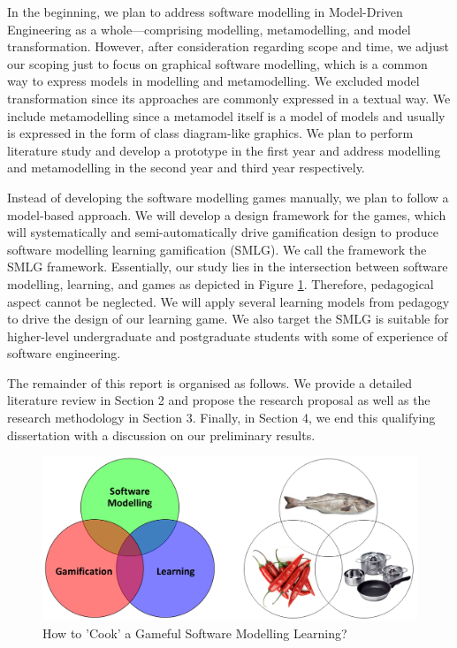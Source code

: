 \documentclass[12pt, a4paper]{report}
\begin{document}
In the beginning, we plan to address software modelling in Model-Driven Engineering as a whole---comprising modelling, metamodelling, and model transformation. However, after consideration regarding scope and time, we adjust our scoping just to focus on graphical software modelling, which is a common way to express models in modelling and metamodelling. We excluded model transformation since its approaches are commonly expressed in a textual way. We include metamodelling since a metamodel itself is a model of models and usually is expressed in the form of class diagram-like graphics. We plan to perform literature study and develop a prototype in the first year and address modelling and metamodelling in the second year and third year respectively. 
    
Instead of developing the software modelling games manually, we plan to follow a model-based approach. We will develop a design framework for the games, which will systematically and semi-automatically drive gamification design to produce software modelling learning gamification (SMLG). We call the framework the SMLG framework. Essentially, our study lies in the intersection between software modelling, learning, and games as depicted in Figure \ref{smlg}. Therefore, pedagogical aspect cannot be neglected. We will apply several learning models from pedagogy to drive the design of our learning game. We also target the SMLG is suitable for higher-level undergraduate and postgraduate students with some of experience of software engineering. 

The remainder of this report is organised as follows. We provide a detailed literature review in Section 2 and propose the research proposal as well as the research methodology in Section 3. Finally, in Section 4, we end this qualifying dissertation with a discussion on our preliminary results. 

\begin{figure}[ht]
\centering
\includegraphics[width=\textwidth]{smlg}
\caption{How to 'Cook' a Gameful Software Modelling Learning?}
\label{smlg}
\end{figure}
\end{document}
